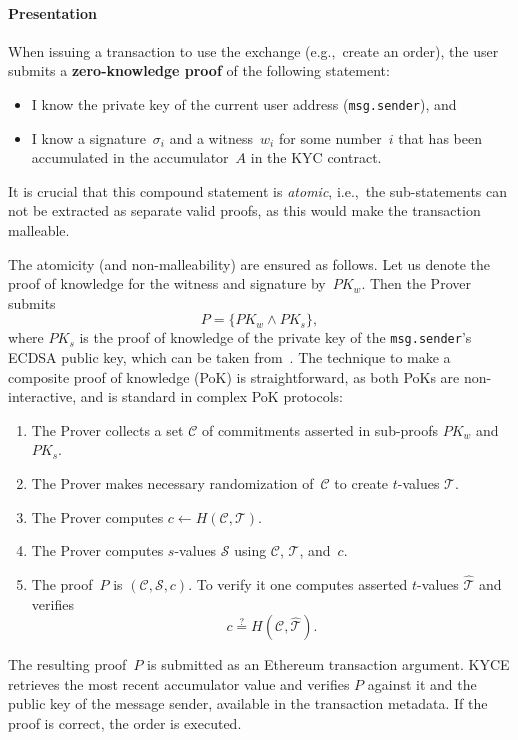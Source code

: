 \paragraph{Presentation} 
When issuing a transaction to use the exchange (e.g.,~create an order), the user submits a \textbf{zero-knowledge proof} of the following statement:
\begin{itemize}
	\item I know the private key of the current user address (\texttt{msg.sender}), and
	\item I know a signature~$\sigma_i$ and a witness~$w_i$ for some number~$i$ that has been accumulated in the
	accumulator~$A$ in the KYC contract.
\end{itemize}
It is crucial that this compound statement is \textit{atomic}, i.e.,~the sub-statements can not be extracted as separate valid proofs, as this would make the transaction malleable.

The atomicity (and non-malleability) are ensured as follows.
Let us denote the proof of knowledge for the witness and signature by~$PK_w$.
Then the Prover submits 
$$
P = \{PK_w \wedge PK_s\},
$$
where $PK_s$ is the proof of knowledge of the private key of the \texttt{msg.sender}'s ECDSA public key, which can be taken from~\cite{Chase2016}.
The technique to make a composite proof of knowledge (PoK) is straightforward, as both PoKs are non-interactive, and is standard in complex PoK protocols:
\begin{enumerate}
	\item The Prover collects a set $\mathcal{C}$ of commitments asserted in sub-proofs $PK_w$ and~$PK_s$.
	\item The Prover makes necessary randomization of~$\mathcal{C}$ to create $t$-values $\mathcal{T}$.
	\item The Prover computes $c \leftarrow H(\mathcal{C},\mathcal{T})$.
	\item The Prover computes $s$-values $\mathcal{S}$ using
	$\mathcal{C}$, $\mathcal{T}$, and~$c$.
	\item The proof~$P$ is $(\mathcal{C}, \mathcal{S},c)$.
	To verify it one computes asserted $t$-values $\widehat{\mathcal{T}}$ and verifies
	$$
	c\overset{?}{=}H(\mathcal{C},\widehat{\mathcal{T}}).
	$$
\end{enumerate}

The resulting proof~$P$ is submitted as an Ethereum transaction argument.
KYCE retrieves the most recent accumulator value and verifies $P$ against it and the public key of the message sender, available in the transaction metadata.
If the proof is correct, the order is executed.


